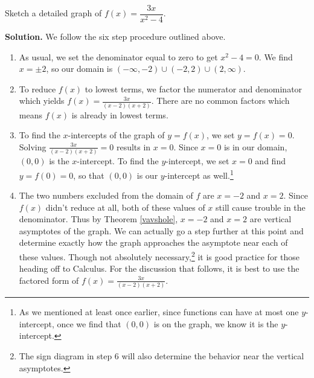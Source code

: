 \begin{ex}  Sketch a detailed graph of $f(x) = \dfrac{3x}{x^2-4}$.

\smallskip

{\bf Solution.}  We follow the six step procedure outlined above.

\begin{enumerate}

\item  As usual, we set the denominator equal to zero to get $x^2 - 4 = 0$.  We find $x = \pm 2$, so our domain is $(-\infty, -2) \cup (-2,2) \cup (2,\infty)$.

\item  To reduce $f(x)$ to lowest terms, we factor the numerator and denominator which yields $f(x) = \frac{3x}{(x-2)(x+2)}$.  There are no common factors which means $f(x)$ is already in lowest terms.

\item  To find the $x$-intercepts of the graph of $y=f(x)$, we set $y=f(x) = 0$.  Solving $ \frac{3x}{(x-2)(x+2)} = 0$ results in $x=0$.  Since $x=0$ is in our domain, $(0,0)$ is the $x$-intercept.  To find the $y$-intercept, we set $x=0$ and find $y = f(0) = 0$, so that $(0,0)$ is our $y$-intercept as well.\footnote{As we mentioned at least once earlier, since functions can have at most one $y$-intercept, once we find that $(0,0)$ is on the graph, we know it is the $y$-intercept.}

\item  The two numbers excluded from the domain of $f$ are $x = -2$ and $x=2$.  Since $f(x)$ didn't reduce at all, both of these values of $x$ still cause trouble in the denominator. Thus by Theorem \ref{vavshole}, $x=-2$ and $x=2$ are vertical asymptotes of the graph.  We can actually go a step further at this point and determine exactly how the graph approaches the asymptote near each of these values. Though not absolutely necessary,\footnote{The sign diagram in step 6 will also determine the behavior near the vertical asymptotes.} it is good practice for those heading off to Calculus.  For the discussion that follows, it is best to use the factored form of $f(x) = \frac{3x}{(x-2)(x+2)}$.

\begin{itemize}


\end{itemize}
\end{enumerate}
\end{ex}
